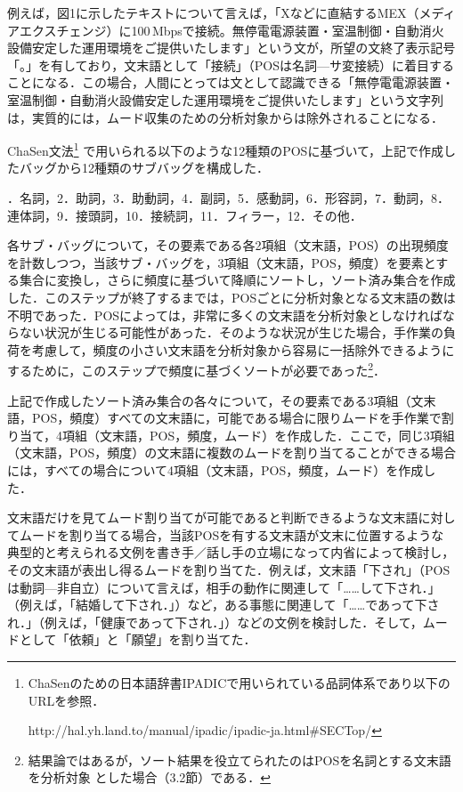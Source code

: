 \documentclass[japanese]{jnlp_1.4}
\newcommand{\InHone}[1]{}
\begin{document}
例えば，図1に示したテキストについて言えば，「Xなどに直結するMEX（メディアエクスチェンジ）に100\,Mbpsで接続。無停電電源装置・室温制御・自動消火設備安定した運用環境をご提供いたします」という文が，所望の文終了表示記号「。」を有しており，文末語として「接続」（POSは名詞—サ変接続）に着目することになる．この場合，人間にとっては文として認識できる「無停電電源装置・室温制御・自動消火設備安定した運用環境をご提供いたします」という文字列は，実質的には，ムード収集のための分析対象からは除外されることになる．

\InHone{(3)}
 ChaSen文法\footnote{
	ChaSenのための日本語辞書IPADICで用いられている品詞体系であり以下のURLを参照．\par\noindent
	http://hal.yh.land.to/manual/ipadic/ipadic-ja.html{\#}SECTop/}
で用いられる以下のような12種類のPOSに基づいて，上記で作成したバッグから12種類のサブバッグを構成した．

{\setlength{\leftskip}{3zw}
．名詞，2．助詞，3．助動詞，4．副詞，5．感動詞，6．形容詞，7．動詞，8．連体詞，9．接頭詞，10．接続詞，11．フィラー，12．その他．\par
}

\InHone{(4)} 
各サブ・バッグについて，その要素である各2項組（文末語，POS）の出現頻度を計数しつつ，当該サブ・バッグを，3項組（文末語，POS，頻度）を要素とする集合に変換し，さらに頻度に基づいて降順にソートし，ソート済み集合を作成した．このステップが終了するまでは，POSごとに分析対象となる文末語の数は不明であった．POSによっては，非常に多くの文末語を分析対象としなければならない状況が生じる可能性があった．そのような状況が生じた場合，手作業の負荷を考慮して，頻度の小さい文末語を分析対象から容易に一括除外できるようにするために，このステップで頻度に基づくソートが必要であった\footnote{
	結果論ではあるが，ソート結果を役立てられたのはPOSを名詞とする文末語を分析対象
	とした場合（3.2節）である．}．

\InHone{(5)} 
上記で作成したソート済み集合の各々について，その要素である3項組（文末語，POS，頻度）すべての文末語に，可能である場合に限りムードを手作業で割り当て，4項組（文末語，POS，頻度，ムード）を作成した．ここで，同じ3項組（文末語，POS，頻度）の文末語に複数のムードを割り当てることができる場合には，すべての場合について4項組（文末語，POS，頻度，ムード）を作成した．

文末語だけを見てムード割り当てが可能であると判断できるような文末語に対してムードを割り当てる場合，当該POSを有する文末語が文末に位置するような典型的と考えられる文例を書き手／話し手の立場になって内省によって検討し，その文末語が表出し得るムードを割り当てた．例えば，文末語「下され」（POSは動詞—非自立）について言えば，相手の動作に関連して「……して下され．」（例えば，「結婚して下され．」）など，ある事態に関連して「……であって下され．」（例えば，「健康であって下され．」）などの文例を検討した．そして，ムードとして「依頼」と「願望」を割り当てた．
\end{document}
